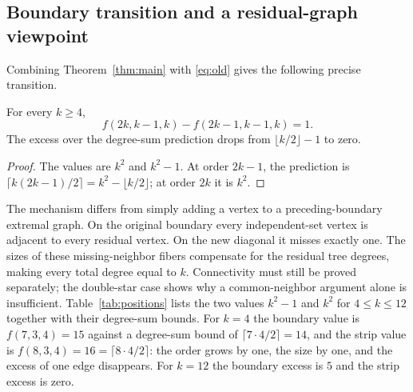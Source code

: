 \subsection{Boundary transition and a residual-graph viewpoint}

Combining Theorem~\ref{thm:main} with \eqref{eq:old} gives the following precise transition.
\begin{corollary}\label{cor:transition}
For every $k\ge4$,
\begin{equation}
f(2k,k-1,k)-f(2k-1,k-1,k)=1.
\end{equation}
The excess over the degree-sum prediction drops from $\lfloor k/2\rfloor-1$ to zero.
\end{corollary}
\begin{proof}
The values are $k^2$ and $k^2-1$.
At order $2k-1$, the prediction is $\lceil k(2k-1)/2\rceil=k^2-\lfloor k/2\rfloor$; at order $2k$ it is $k^2$.
\end{proof}

The mechanism differs from simply adding a vertex to a preceding-boundary extremal graph.
On the original boundary every independent-set vertex is adjacent to every residual vertex.
On the new diagonal it misses exactly one. The sizes of these missing-neighbor fibers compensate for the residual tree degrees, making every total degree equal to $k$.
Connectivity must still be proved separately; the double-star case shows why a common-neighbor argument alone is insufficient.
Table~\ref{tab:positions} lists the two values $k^2-1$ and $k^2$ for $4\le k\le12$ together with their degree-sum bounds.
For $k=4$ the boundary value is $f(7,3,4)=15$ against a degree-sum bound of $\lceil 7\cdot4/2\rceil=14$, and the strip value is $f(8,3,4)=16=\lceil8\cdot4/2\rceil$: the order grows by one, the size by one, and the excess of one edge disappears.
For $k=12$ the boundary excess is $5$ and the strip excess is zero.

